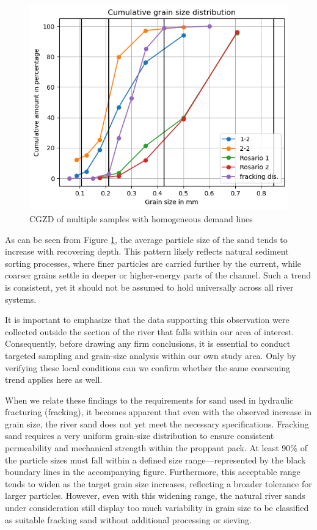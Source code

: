 \begin{figure}[H]
    \centering
    \includegraphics[width=0.75\linewidth]{figures//ch6/references_distribution.png}
    \caption{CGZD of multiple samples with homogeneous demand lines \autocite{bensonFracSandUnited2015}}
    \label{fig:rd}
\end{figure}

As can be seen from Figure \ref{fig:rd}, the average particle size of the sand tends to increase with recovering depth. This pattern likely reflects natural sediment sorting processes, where finer particles are carried further by the current, while coarser grains settle in deeper or higher-energy parts of the channel. Such a trend is consistent, yet it should not be assumed to hold universally across all river systems.

It is important to emphasize that the data supporting this observation were collected outside the section of the river that falls within our area of interest. Consequently, before drawing any firm conclusions, it is essential to conduct targeted sampling and grain-size analysis within our own study area. Only by verifying these local conditions can we confirm whether the same coarsening trend applies here as well.

When we relate these findings to the requirements for sand used in hydraulic fracturing (fracking), it becomes apparent that even with the observed increase in grain size, the river sand does not yet meet the necessary specifications. Fracking sand requires a very uniform grain-size distribution to ensure consistent permeability and mechanical strength within the proppant pack. At least 90\% of the particle sizes must fall within a defined size range—represented by the black boundary lines in the accompanying figure.
Furthermore, this acceptable range tends to widen as the target grain size increases, reflecting a broader tolerance for larger particles. However, even with this widening range, the natural river sands under consideration still display too much variability in grain size to be classified as suitable fracking sand without additional processing or sieving.


